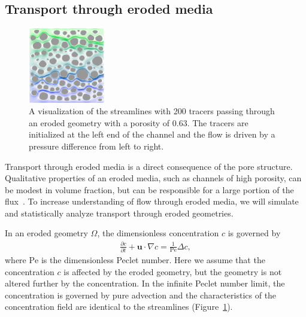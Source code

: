 \documentclass[11pt]{article}
\newcommand{\pd}[2]{ \frac{ \partial #1}{ \partial #2 } }
\newcommand{\bvec}[1]{{\mathbf{#1}}}
\newcommand{\Pe}{\mathrm{Pe}}
\newcommand{\uu}{\bvec{u}}
\begin{document}
 
\subsection{Transport through eroded media}

\begin{figure}
  \includegraphics[width=0.3\textwidth]{figs/100b_t100tracer}
  \caption{\label{fig:100tracers} A visualization of the streamlines
  with 200 tracers passing through an eroded geometry with a porosity of
  0.63. The tracers are initialized at the left end of the channel and
  the flow is driven by a pressure difference from left to right.}
\end{figure}

Transport through eroded media is a direct consequence of the pore structure. Qualitative properties of an eroded media, such as channels of high porosity, can be modest in volume fraction, but can be responsible for a large portion of the flux~\cite{Quaife2018}.  To increase understanding of flow through eroded media, we will simulate and statistically analyze transport through eroded geometries.

In an eroded geometry $\Omega$, the dimensionless
concentration $c$ is governed by
\begin{align}
  \pd{c}{t} + \uu \cdot \nabla c = \frac{1}{\Pe} \Delta c, 
  \label{eqn:advectionDiffusion}
\end{align}
where $\Pe$ is the dimensionless Peclet number. Here we assume that the
concentration $c$ is affected by the eroded geometry, but the geometry
is not altered further by the concentration. In the infinite Peclet
number limit, the concentration is governed by pure advection and the
characteristics of the concentration field are identical to the
streamlines (Figure~\ref{fig:100tracers}).
\end{document}
